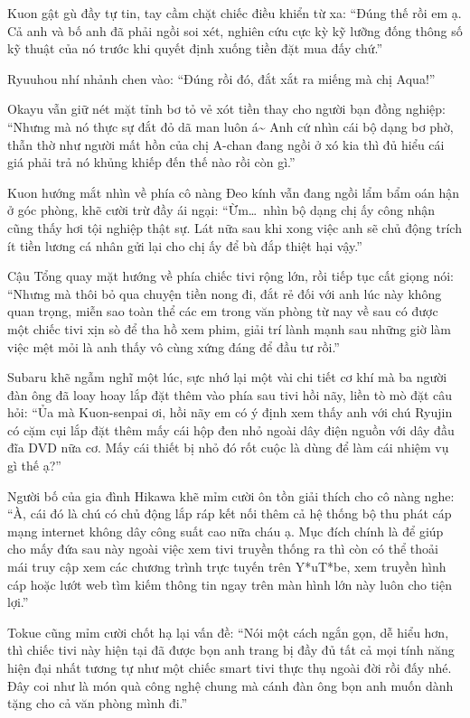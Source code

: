 \documentclass[../main.tex]{subfiles}
\begin{document}
Kuon gật gù đầy tự tin, tay cầm chặt chiếc điều khiển từ xa: ``Đúng thế rồi em ạ. Cả anh và bố anh đã phải ngồi soi xét, nghiên cứu cực kỳ kỹ lưỡng đống thông số kỹ thuật của nó trước khi quyết định xuống tiền đặt mua đấy chứ.''

Ryuuhou nhí nhảnh chen vào: ``Đúng rồi đó, đắt xắt ra miếng mà chị Aqua!''

Okayu vẫn giữ nét mặt tỉnh bơ tỏ vẻ xót tiền thay cho người bạn đồng nghiệp: ``Nhưng mà nó thực sự đắt đỏ dã man luôn á\~{} Anh cứ nhìn cái bộ dạng bơ phờ, thẫn thờ như người mất hồn của chị A-chan đang ngồi ở xó kia thì đủ hiểu cái giá phải trả nó khủng khiếp đến thế nào rồi còn gì.''

Kuon hướng mắt nhìn về phía cô nàng Đeo kính vẫn đang ngồi lẩm bẩm oán hận ở góc phòng, khẽ cười trừ đầy ái ngại: ``Ừm\dots\ nhìn bộ dạng chị ấy công nhận cũng thấy hơi tội nghiệp thật sự. Lát nữa sau khi xong việc anh sẽ chủ động trích ít tiền lương cá nhân gửi lại cho chị ấy để bù đắp thiệt hại vậy.''

Cậu Tổng quay mặt hướng về phía chiếc tivi rộng lớn, rồi tiếp tục cất giọng nói: ``Nhưng mà thôi bỏ qua chuyện tiền nong đi, đắt rẻ đối với anh lúc này không quan trọng, miễn sao toàn thể các em trong văn phòng từ nay về sau có được một chiếc tivi xịn sò để tha hồ xem phim, giải trí lành mạnh sau những giờ làm việc mệt mỏi là anh thấy vô cùng xứng đáng để đầu tư rồi.''

Subaru khẽ ngẫm nghĩ một lúc, sực nhớ lại một vài chi tiết cơ khí mà ba người đàn ông đã loay hoay lắp đặt thêm vào phía sau tivi hồi nãy, liền tò mò đặt câu hỏi: ``Ủa mà Kuon-senpai ơi, hồi nãy em có ý định xem thấy anh với chú Ryujin có cặm cụi lắp đặt thêm mấy cái hộp đen nhỏ ngoài dây điện nguồn với dây đầu đĩa DVD nữa cơ. Mấy cái thiết bị nhỏ đó rốt cuộc là dùng để làm cái nhiệm vụ gì thế ạ?''

Người bố của gia đình Hikawa khẽ mỉm cười ôn tồn giải thích cho cô nàng nghe: ``À, cái đó là chú có chủ động lắp ráp kết nối thêm cả hệ thống bộ thu phát cáp mạng internet không dây công suất cao nữa cháu ạ. Mục đích chính là để giúp cho mấy đứa sau này ngoài việc xem tivi truyền thống ra thì còn có thể thoải mái truy cập xem các chương trình trực tuyến trên Y*uT*be, xem truyền hình cáp hoặc lướt web tìm kiếm thông tin ngay trên màn hình lớn này luôn cho tiện lợi.''

Tokue cũng mỉm cười chốt hạ lại vấn đề: ``Nói một cách ngắn gọn, dễ hiểu hơn, thì chiếc tivi này hiện tại đã được bọn anh trang bị đầy đủ tất cả mọi tính năng hiện đại nhất tương tự như một chiếc smart tivi thực thụ ngoài đời rồi đấy nhé. Đây coi như là món quà công nghệ chung mà cánh đàn ông bọn anh muốn dành tặng cho cả văn phòng mình đi.''
\end{document}
